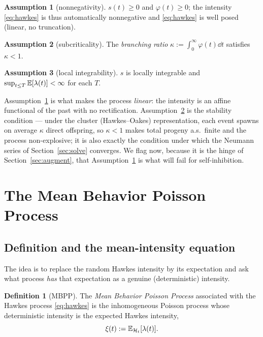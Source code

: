 \documentclass[11pt]{article}
\theoremstyle{plain}
\theoremstyle{definition}
\newtheorem{definition}[theorem]{Definition}
\newtheorem{assumption}{Assumption}[section]
\theoremstyle{remark}
\newcommand{\Hist}{\mathcal{H}}\newcommand{\Filt}{\mathcal{F}}\newcommand{\conv}{\ast}
\begin{document}
\begin{assumption}[nonnegativity]\label{ass:nonneg}
$s(t)\ge0$ and $\varphi(t)\ge0$; the intensity \eqref{eq:hawkes} is thus
automatically nonnegative and \eqref{eq:hawkes} is well posed (linear, no
truncation).
\end{assumption}
\begin{assumption}[subcriticality]\label{ass:subcrit}
The \emph{branching ratio} $\kappa:=\int_0^\infty\varphi(t)\dd t$ satisfies
$\kappa<1$.
\end{assumption}
\begin{assumption}[local integrability]\label{ass:integ}
$s$ is locally integrable and $\sup_{t\le T}\mathbb{E}[\lambda(t)]<\infty$ for each $T$.
\end{assumption}

Assumption~\ref{ass:nonneg} is what makes the process \emph{linear}: the intensity
is an affine functional of the past with no rectification. Assumption~\ref{ass:subcrit}
is the stability condition --- under the cluster (Hawkes--Oakes) representation,
each event spawns on average $\kappa$ direct offspring, so $\kappa<1$ makes total
progeny a.s.\ finite and the process non-explosive; it is also exactly the
condition under which the Neumann series of Section~\ref{sec:solve} converges.
We flag now, because it is the hinge of Section~\ref{sec:augment}, that
Assumption~\ref{ass:nonneg} is what will fail for self-inhibition.

\section{The Mean Behavior Poisson Process}
\label{sec:mbpp}

\subsection{Definition and the mean-intensity equation}

The idea is to replace the random Hawkes intensity by its expectation and ask what
process \emph{has} that expectation as a genuine (deterministic) intensity.

\begin{definition}[MBPP]
\label{def:mbpp}
The \emph{Mean Behavior Poisson Process} associated with the Hawkes process
\eqref{eq:hawkes} is the inhomogeneous Poisson process whose deterministic
intensity is the expected Hawkes intensity,
\begin{equation}
\xi(t):=\E_{\Hist_t}[\lambda(t)].
\label{eq:xidef}
\end{equation}
\end{definition}
\end{document}
